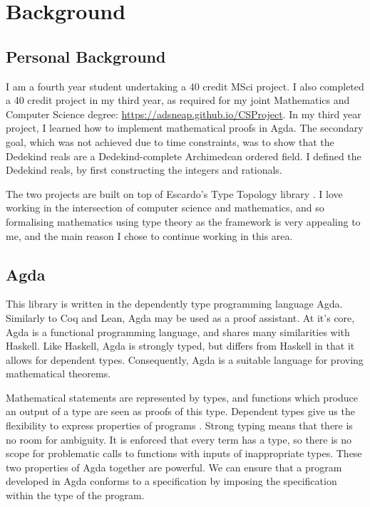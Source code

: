 \documentclass[ProjectReport]{subfiles}
\begin{document}
\section{Background}

\subsection{Personal Background}

I am a fourth year student undertaking a 40 credit MSci project. I also completed a 40 credit project in my third year, as required for my joint Mathematics and Computer Science degree: \url{https://adsneap.github.io/CSProject}. In my third year project, I learned how to implement mathematical proofs in Agda. The secondary goal, which was not achieved due to time constraints, was to show that the Dedekind reals are a Dedekind-complete Archimedean ordered field. I defined the Dedekind reals, by first constructing the integers and rationals.

The two projects are built on top of Escardo's Type Topology library \cite{TypeTopology}. I love working in the intersection of computer science and mathematics, and so formalising mathematics using type theory as the framework is very appealing to me, and the main reason I chose to continue working in this area.

\subsection{Agda}

This library is written in the dependently type programming language Agda. Similarly to Coq and Lean, Agda may be used as a proof assistant. At it's core, Agda is a functional programming language, and shares many similarities with Haskell. Like Haskell, Agda is strongly typed, but differs from Haskell in that it allows for dependent types. Consequently, Agda is a suitable language for proving mathematical theorems. 

Mathematical statements are represented by types, and functions which produce an output of a type are seen as proofs of this type. Dependent types give us the flexibility to express properties of programs \cite{AgdaDependentTypes}. Strong typing means that there is no room for ambiguity. It is enforced that every term has a type, so there is no scope for problematic calls to functions with inputs of inappropriate types. These two properties of Agda together are powerful. We can ensure that a program developed in Agda conforms to a specification by imposing the specification within the type of the program.
\end{document}
